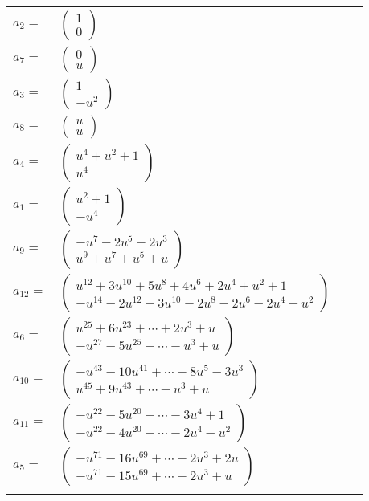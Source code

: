 \documentclass[1p]{elsarticle_modified}
\theoremstyle{definition}
\begin{document}
\begin{tabular}{m{7pt} m{180pt} m{7pt} m{180pt} }
\flushright $a_{2}=$&$\begin{pmatrix}1\\0\end{pmatrix}$ \\
\flushright $a_{7}=$&$\begin{pmatrix}0\\u\end{pmatrix}$ \\
\flushright $a_{3}=$&$\begin{pmatrix}1\\- u^2\end{pmatrix}$ \\
\flushright $a_{8}=$&$\begin{pmatrix}u\\u\end{pmatrix}$ \\
\flushright $a_{4}=$&$\begin{pmatrix}u^4+u^2+1\\u^4\end{pmatrix}$ \\
\flushright $a_{1}=$&$\begin{pmatrix}u^2+1\\- u^4\end{pmatrix}$ \\
\flushright $a_{9}=$&$\begin{pmatrix}- u^7-2 u^5-2 u^3\\u^9+u^7+u^5+u\end{pmatrix}$ \\
\flushright $a_{12}=$&$\begin{pmatrix}u^{12}+3 u^{10}+5 u^8+4 u^6+2 u^4+u^2+1\\- u^{14}-2 u^{12}-3 u^{10}-2 u^8-2 u^6-2 u^4- u^2\end{pmatrix}$ \\
\flushright $a_{6}=$&$\begin{pmatrix}u^{25}+6 u^{23}+\cdots+2 u^3+u\\- u^{27}-5 u^{25}+\cdots- u^3+u\end{pmatrix}$ \\
\flushright $a_{10}=$&$\begin{pmatrix}- u^{43}-10 u^{41}+\cdots-8 u^5-3 u^3\\u^{45}+9 u^{43}+\cdots- u^3+u\end{pmatrix}$ \\
\flushright $a_{11}=$&$\begin{pmatrix}- u^{22}-5 u^{20}+\cdots-3 u^4+1\\- u^{22}-4 u^{20}+\cdots-2 u^4- u^2\end{pmatrix}$ \\
\flushright $a_{5}=$&$\begin{pmatrix}- u^{71}-16 u^{69}+\cdots+2 u^3+2 u\\- u^{71}-15 u^{69}+\cdots-2 u^3+u\end{pmatrix}$\\&\end{tabular}
\end{document}
